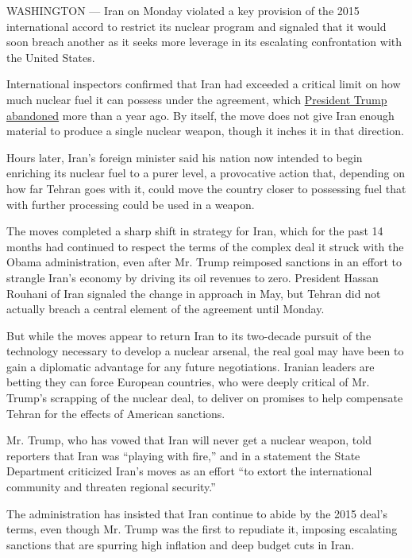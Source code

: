 WASHINGTON --- Iran on Monday violated a key provision of the 2015
international accord to restrict its nuclear program and signaled that
it would soon breach another as it seeks more leverage in its escalating
confrontation with the United States.

International inspectors confirmed that Iran had exceeded a critical
limit on how much nuclear fuel it can possess under the agreement, which
\href{https://www.nytimes3xbfgragh.onion/2018/05/08/world/middleeast/trump-iran-nuclear-deal.html}{President
Trump abandoned} more than a year ago. By itself, the move does not give
Iran enough material to produce a single nuclear weapon, though it
inches it in that direction.

Hours later, Iran's foreign minister said his nation now intended to
begin enriching its nuclear fuel to a purer level, a provocative action
that, depending on how far Tehran goes with it, could move the country
closer to possessing fuel that with further processing could be used in
a weapon.

The moves completed a sharp shift in strategy for Iran, which for the
past 14 months had continued to respect the terms of the complex deal it
struck with the Obama administration, even after Mr. Trump reimposed
sanctions in an effort to strangle Iran's economy by driving its oil
revenues to zero. President Hassan Rouhani of Iran signaled the change
in approach in May, but Tehran did not actually breach a central element
of the agreement until Monday.

But while the moves appear to return Iran to its two-decade pursuit of
the technology necessary to develop a nuclear arsenal, the real goal may
have been to gain a diplomatic advantage for any future negotiations.
Iranian leaders are betting they can force European countries, who were
deeply critical of Mr. Trump's scrapping of the nuclear deal, to deliver
on promises to help compensate Tehran for the effects of American
sanctions.

Mr. Trump, who has vowed that Iran will never get a nuclear weapon, told
reporters that Iran was ``playing with fire,'' and in a statement the
State Department criticized Iran's moves as an effort ``to extort the
international community and threaten regional security.''

The administration has insisted that Iran continue to abide by the 2015
deal's terms, even though Mr. Trump was the first to repudiate it,
imposing escalating sanctions that are spurring high inflation and deep
budget cuts in Iran.

